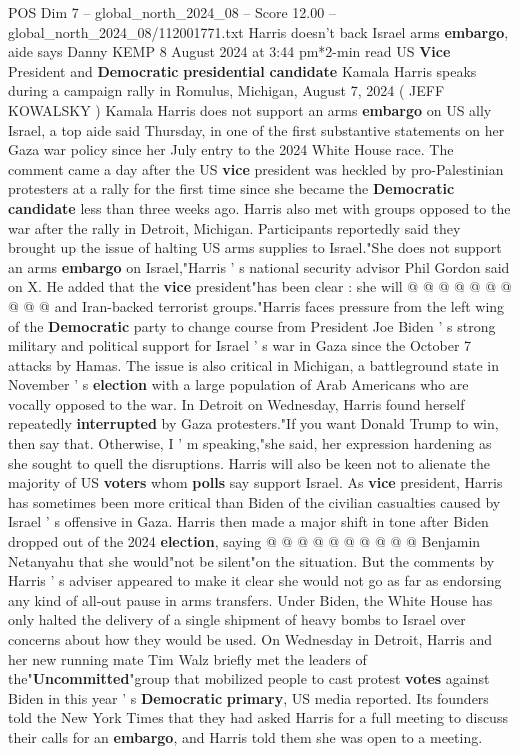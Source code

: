 \begin{textsample}{POS Dim 7 – global\_north\_2024\_08 – Score 12.00 – global\_north\_2024\_08/112001771.txt}  \label{ex:f7_pos_018}
Harris doesn't back Israel arms \textbf{embargo}, aide says Danny KEMP 8 August 2024 at 3:44 pm*2-min read US \textbf{Vice} President and \textbf{Democratic} \textbf{presidential} \textbf{candidate} Kamala Harris speaks during a campaign rally in Romulus, Michigan, August 7, 2024 ( JEFF KOWALSKY ) Kamala Harris does not support an arms \textbf{embargo} on US ally Israel, a top aide said Thursday, in one of the first substantive statements on her Gaza war policy since her July entry to the 2024 White House race.
The comment came a day after the US \textbf{vice} president was heckled by pro-Palestinian protesters at a rally for the first time since she became the \textbf{Democratic} \textbf{candidate} less than three weeks ago.
Harris also met with groups opposed to the war after the rally in Detroit, Michigan.
Participants reportedly said they brought up the issue of halting US arms supplies to Israel."She does not support an arms \textbf{embargo} on Israel,"Harris ' s national security advisor Phil Gordon said on X.
He added that the \textbf{vice} president"has been clear : she will @ @ @ @ @ @ @ @ @ @ and Iran-backed terrorist groups."Harris faces pressure from the left wing of the \textbf{Democratic} party to change course from President Joe Biden ' s strong military and political support for Israel ' s war in Gaza since the October 7 attacks by Hamas.
The issue is also critical in Michigan, a battleground state in November ' s \textbf{election} with a large population of Arab Americans who are vocally opposed to the war.
In Detroit on Wednesday, Harris found herself repeatedly \textbf{interrupted} by Gaza protesters."If you want Donald Trump to win, then say that.
Otherwise, I ' m speaking,"she said, her expression hardening as she sought to quell the disruptions.
Harris will also be keen not to alienate the majority of US \textbf{voters} whom \textbf{polls} say support Israel.
As \textbf{vice} president, Harris has sometimes been more critical than Biden of the civilian casualties caused by Israel ' s offensive in Gaza.
Harris then made a major shift in tone after Biden dropped out of the 2024 \textbf{election}, saying @ @ @ @ @ @ @ @ @ @ Benjamin Netanyahu that she would"not be silent"on the situation.
But the comments by Harris ' s adviser appeared to make it clear she would not go as far as endorsing any kind of all-out pause in arms transfers.
Under Biden, the White House has only halted the delivery of a single shipment of heavy bombs to Israel over concerns about how they would be used.
On Wednesday in Detroit, Harris and her new running mate Tim Walz briefly met the leaders of the"\textbf{Uncommitted}"group that mobilized people to cast protest \textbf{votes} against Biden in this year ' s \textbf{Democratic} \textbf{primary}, US media reported.
Its founders told the New York Times that they had asked Harris for a full meeting to discuss their calls for an \textbf{embargo}, and Harris told them she was open to a meeting.

\end{textsample}
